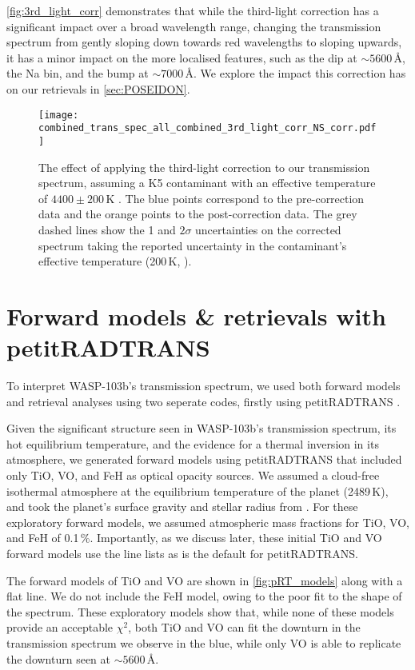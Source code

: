 \documentclass[twocolumn]{aastex63}
\begin{document}
\autoref{fig:3rd_light_corr} demonstrates that while the third-light correction has a significant impact over a broad wavelength range, changing the transmission spectrum from gently sloping down towards red wavelengths to sloping upwards, it has a minor impact on the more localised features, such as the dip at ${\sim}5600$\,\AA, the Na bin, and the bump at ${\sim}7000$\,\AA. We explore the impact this correction has on our retrievals in \autoref{sec:POSEIDON}.

\begin{figure}
    \centering
    \texttt{[image: combined\_trans\_spec\_all\_combined\_3rd\_light\_corr\_NS\_corr.pdf]}
    \caption{The effect of applying the third-light correction to our transmission spectrum, assuming a K5 contaminant with an effective temperature of $4400 \pm 200$\,K \protect\citep{Cartier2017}. The blue points correspond to the pre-correction data and the orange points to the post-correction data. The grey dashed lines show the 1 and $2\sigma$ uncertainties on the corrected spectrum taking the reported uncertainty in the contaminant's effective temperature (200\,K, \protect\citealt{Cartier2017}).}
    \label{fig:3rd_light_corr}
\end{figure}


\section{Forward models \& retrievals with petitRADTRANS}
\label{sec:pRT}

To interpret WASP-103b's transmission spectrum, we used both forward models and retrieval analyses using two seperate codes, firstly using petitRADTRANS \citep{Molliere2019}.

Given the significant structure seen in WASP-103b's transmission spectrum, its hot equilibrium temperature, and the evidence for a thermal inversion in its atmosphere, we generated forward models using petitRADTRANS that included only TiO, VO, and FeH as optical opacity sources. We assumed a cloud-free isothermal atmosphere at the equilibrium temperature of the planet (2489\,K), and took the planet's surface gravity and stellar radius from \cite{Delrez2018}. For these exploratory forward models, we assumed atmospheric mass fractions for TiO, VO, and FeH of 0.1\,\%. Importantly, as we discuss later, these initial TiO and VO forward models use the \cite{Plez1998,Plez1999} line lists as is the default for petitRADTRANS.

The forward models of TiO and VO are shown in \autoref{fig:pRT_models} along with a flat line. We do not include the FeH model, owing to the poor fit to the shape of the spectrum. These exploratory models show that, while none of these models provide an acceptable $\chi^2$, both TiO and VO can fit the downturn in the transmission spectrum we observe in the blue, while only VO is able to replicate the downturn seen at ${\sim}5600$\,\AA. 
\end{document}
